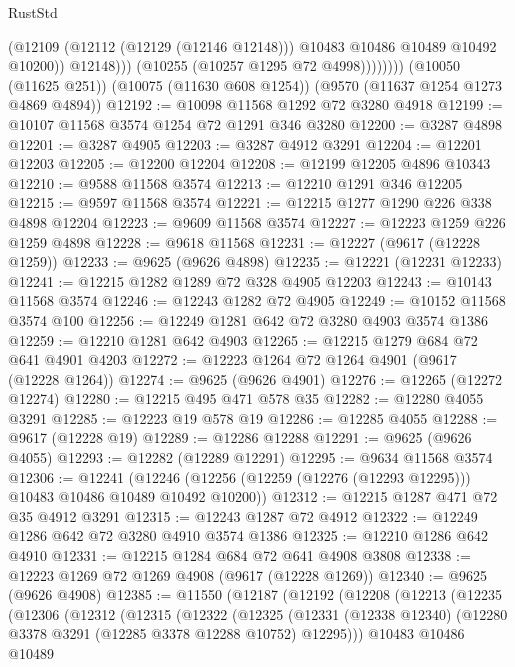 \begin{lexlean}{RustStd}
\begin{coremodule}
{\begin{coremodule}
{{{{{{{{{{{{{{{{{{{{{{{{{{{{{{{{{                        (@12109
                          (@12112 (@12129 (@12146 @12148)))
                          @10483
                          @10486
                          @10489
                          @10492
                          @10200))
                      @12148)))
                (@10255 (@10257 @1295 @72 @4998))))))))
    (@10050 (@11625 @251))
    (@10075 (@11630 @608 @1254))
    (@9570 (@11637 @1254 @1273 @4869 @4894))
@12192 := @10098 @11568 @1292 @72 @3280 @4918
@12199 := @10107 @11568 @3574 @1254 @72 @1291 @346 @3280
@12200 := @3287 @4898
@12201 := @3287 @4905
@12203 := @3287 @4912 @3291
@12204 := @12201 @12203
@12205 := @12200 @12204
@12208 := @12199 @12205 @4896 @10343
@12210 := @9588 @11568 @3574
@12213 := @12210 @1291 @346 @12205
@12215 := @9597 @11568 @3574
@12221 := @12215 @1277 @1290 @226 @338 @4898 @12204
@12223 := @9609 @11568 @3574
@12227 := @12223 @1259 @226 @1259 @4898
@12228 := @9618 @11568
@12231 := @12227 (@9617 (@12228 @1259))
@12233 := @9625 (@9626 @4898)
@12235 := @12221 (@12231 @12233)
@12241 := @12215 @1282 @1289 @72 @328 @4905 @12203
@12243 := @10143 @11568 @3574
@12246 := @12243 @1282 @72 @4905
@12249 := @10152 @11568 @3574 @100
@12256 := @12249 @1281 @642 @72 @3280 @4903 @3574 @1386
@12259 := @12210 @1281 @642 @4903
@12265 := @12215 @1279 @684 @72 @641 @4901 @4203
@12272 := @12223 @1264 @72 @1264 @4901 (@9617 (@12228 @1264))
@12274 := @9625 (@9626 @4901)
@12276 := @12265 (@12272 @12274)
@12280 := @12215 @495 @471 @578 @35
@12282 := @12280 @4055 @3291
@12285 := @12223 @19 @578 @19
@12286 := @12285 @4055
@12288 := @9617 (@12228 @19)
@12289 := @12286 @12288
@12291 := @9625 (@9626 @4055)
@12293 := @12282 (@12289 @12291)
@12295 := @9634 @11568 @3574
@12306 := @12241
    (@12246 (@12256 (@12259 (@12276 (@12293 @12295))) @10483 @10486 @10489 @10492 @10200))
@12312 := @12215 @1287 @471 @72 @35 @4912 @3291
@12315 := @12243 @1287 @72 @4912
@12322 := @12249 @1286 @642 @72 @3280 @4910 @3574 @1386
@12325 := @12210 @1286 @642 @4910
@12331 := @12215 @1284 @684 @72 @641 @4908 @3808
@12338 := @12223 @1269 @72 @1269 @4908 (@9617 (@12228 @1269))
@12340 := @9625 (@9626 @4908)
@12385 := @11550
    (@12187
      (@12192
        (@12208
          (@12213
            (@12235
              (@12306
                (@12312
                  (@12315
                    (@12322
                      (@12325
                        (@12331
                          (@12338 @12340)
                          (@12280 @3378 @3291 (@12285 @3378 @12288 @10752) @12295)))
                      @10483
                      @10486
                      @10489
}}}}}}}}}}}}}}}}}}}}}}}}}}}}}}}}}
\end{coremodule}}
\end{coremodule}
\end{lexlean}
